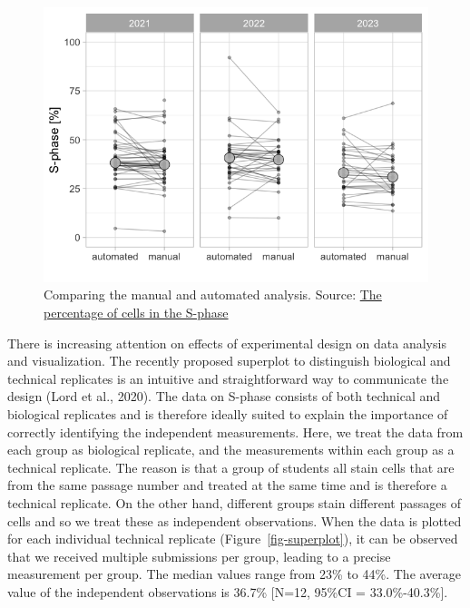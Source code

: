 \documentclass[
]{agujournal2019}
\begin{document}
\begin{figure}[H]

{\centering \includegraphics{index_files/figure-latex/fig-paired-data-output-1.png}

}

\caption{\label{fig-paired-data}Comparing the manual and automated
analysis. Source:
\href{https://JoachimGoedhart.github.io/MS-StudentSourcing/notebooks/PreciSe-preview.html\#cell-fig-paired-data}{The
percentage of cells in the S-phase}}

\end{figure}

There is increasing attention on effects of experimental design on data
analysis and visualization. The recently proposed superplot to
distinguish biological and technical replicates is an intuitive and
straightforward way to communicate the design (Lord et al., 2020). The
data on S-phase consists of both technical and biological replicates and
is therefore ideally suited to explain the importance of correctly
identifying the independent measurements. Here, we treat the data from
each group as biological replicate, and the measurements within each
group as a technical replicate. The reason is that a group of students
all stain cells that are from the same passage number and treated at the
same time and is therefore a technical replicate. On the other hand,
different groups stain different passages of cells and so we treat these
as independent observations. When the data is plotted for each
individual technical replicate (Figure~\ref{fig-superplot}), it can be
observed that we received multiple submissions per group, leading to a
precise measurement per group. The median values range from 23\% to
44\%. The average value of the independent observations is 36.7\%
{[}N=12, 95\%CI = 33.0\%-40.3\%{]}.
\end{document}

